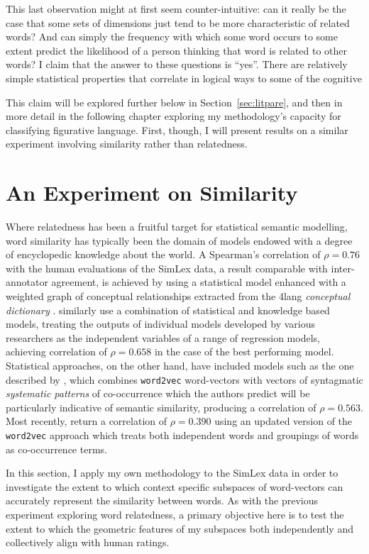 This last observation might at first seem counter-intuitive: can it really be the case that some sets of dimensions just tend to be more characteristic of related words?  And can simply the frequency with which some word occurs to some extent predict the likelihood of a person thinking that word is related to other words?  I claim that the answer to these questions is ``yes''.  There are relatively simple statistical properties that correlate in logical ways to some of the cognitive 

This claim will be explored further below in Section~\ref{sec:litpare}, and then in more detail in the following chapter exploring my methodology's capacity for classifying figurative language.  First, though, I will present results on a similar experiment involving similarity rather than relatedness.

\section{An Experiment on Similarity}
Where relatedness has been a fruitful target for statistical semantic modelling, word similarity has typically been the domain of models endowed with a degree of encyclopedic knowledge about the world.  A Spearman's correlation of $\rho = 0.76$ with the human evaluations of the SimLex data, a result comparable with inter-annotator agreement, is achieved by \cite{RecksiEA2016} using a statistical model enhanced with a weighted graph of conceptual relationships extracted from the 4lang \emph{conceptual dictionary} \citep{KornaiEA2015}.  \cite{BanjadeEA2015} similarly use a combination of statistical and knowledge based models, treating the outputs of individual models developed by various researchers as the independent variables of a range of regression models, achieving correlation of $\rho = 0.658$ in the case of the best performing model.  Statistical approaches, on the other hand, have included models such as the one described by \cite{SchwartzEA2015}, which combines \texttt{word2vec} word-vectors with vectors of syntagmatic \emph{systematic patterns} of co-occurrence which the authors predict will be particularly indicative of semantic similarity, producing a correlation of $\rho = 0.563$.  Most recently, \cite{MaEA2017} return a correlation of $\rho = 0.390$ using an updated version of the \texttt{word2vec} approach which treats both independent words and groupings of words as co-occurrence terms.

In this section, I apply my own methodology to the SimLex data in order to investigate the extent to which context specific subspaces of word-vectors can accurately represent the similarity between words.  As with the previous experiment exploring word relatedness, a primary objective here is to test the extent to which the geometric features of my subspaces both independently and collectively align with human ratings.



